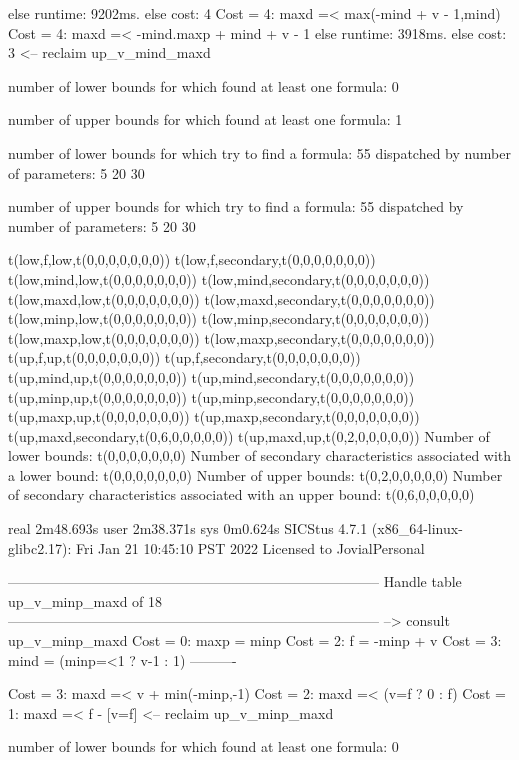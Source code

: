 else runtime: 9202ms. else cost: 4
Cost =  4:  maxd =< max(-mind + v - 1,mind) %
Cost =  4:  maxd =< -mind.maxp + mind + v - 1
else runtime: 3918ms. else cost: 3
<-- reclaim up_v_mind_maxd

number of lower bounds for which found at least one formula: 0

number of upper bounds for which found at least one formula: 1

number of lower bounds for which try to find a formula: 55
dispatched by number of parameters: 5  20  30

number of upper bounds for which try to find a formula: 55
dispatched by number of parameters: 5  20  30

t(low,f,low,t(0,0,0,0,0,0,0))
t(low,f,secondary,t(0,0,0,0,0,0,0))
t(low,mind,low,t(0,0,0,0,0,0,0))
t(low,mind,secondary,t(0,0,0,0,0,0,0))
t(low,maxd,low,t(0,0,0,0,0,0,0))
t(low,maxd,secondary,t(0,0,0,0,0,0,0))
t(low,minp,low,t(0,0,0,0,0,0,0))
t(low,minp,secondary,t(0,0,0,0,0,0,0))
t(low,maxp,low,t(0,0,0,0,0,0,0))
t(low,maxp,secondary,t(0,0,0,0,0,0,0))
t(up,f,up,t(0,0,0,0,0,0,0))
t(up,f,secondary,t(0,0,0,0,0,0,0))
t(up,mind,up,t(0,0,0,0,0,0,0))
t(up,mind,secondary,t(0,0,0,0,0,0,0))
t(up,minp,up,t(0,0,0,0,0,0,0))
t(up,minp,secondary,t(0,0,0,0,0,0,0))
t(up,maxp,up,t(0,0,0,0,0,0,0))
t(up,maxp,secondary,t(0,0,0,0,0,0,0))
t(up,maxd,secondary,t(0,6,0,0,0,0,0))
t(up,maxd,up,t(0,2,0,0,0,0,0))
Number of lower bounds:                                             t(0,0,0,0,0,0,0)
Number of secondary characteristics associated with a lower bound:  t(0,0,0,0,0,0,0)
Number of upper bounds:                                             t(0,2,0,0,0,0,0)
Number of secondary characteristics associated with an upper bound: t(0,6,0,0,0,0,0)

real	2m48.693s
user	2m38.371s
sys	0m0.624s
SICStus 4.7.1 (x86_64-linux-glibc2.17): Fri Jan 21 10:45:10 PST 2022
Licensed to JovialPersonal


--------------------------------------------------------------------------------
Handle table up_v_minp_maxd of 18
--------------------------------------------------------------------------------
--> consult up_v_minp_maxd
Cost =  0:  maxp = minp
Cost =  2:  f    = -minp + v
Cost =  3:  mind = (minp=<1 ? v-1 : 1)
----------

Cost =  3:  maxd =< v + min(-minp,-1) %
Cost =  2:  maxd =< (v=f ? 0 : f)
Cost =  1:  maxd =< f - [v=f] %
<-- reclaim up_v_minp_maxd

number of lower bounds for which found at least one formula: 0

